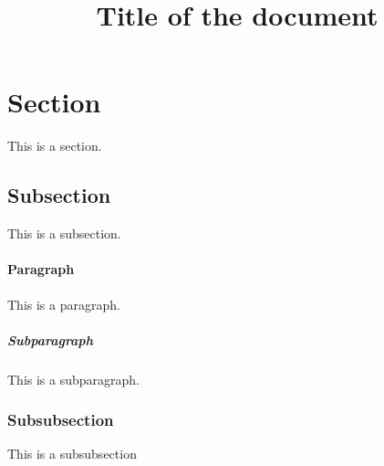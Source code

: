 \documentclass[stu, 12pt, donotrepeattitle, svgnames, floatsintext]{apa7}                                %
\title{Title of the document}
\begin{document}
\maketitle
\section{Section}
This is a section.

\subsection{Subsection}
This is a subsection. \autocite{webbMisdiagnosisDualDiagnosis2011}
\paragraph{Paragraph}
This is a paragraph.
\subparagraph{Subparagraph}
This is a subparagraph.
\subsubsection{Subsubsection}
This is a subsubsection
\pagebreak

{}
\printbibliography[title={References}]
\end{document}
